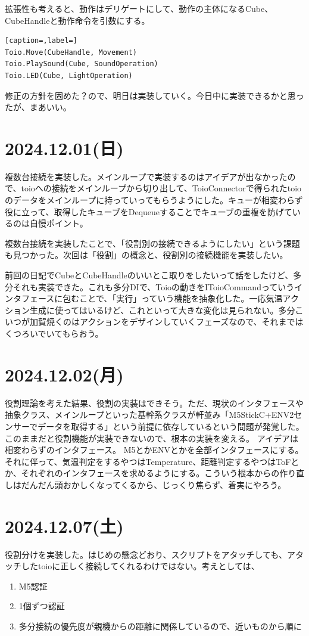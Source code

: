 \documentclass[fleqn,twocolumn]{mynote}
\begin{document}
  拡張性も考えると、動作はデリゲートにして、動作の主体になるCube、CubeHandleと動作命令を引数にする。

  \begin{lstlisting}[caption=,label=]
Toio.Move(CubeHandle, Movement)
Toio.PlaySound(Cube, SoundOperation)
Toio.LED(Cube, LightOperation)
  \end{lstlisting}

  修正の方針を固めた？ので、明日は実装していく。今日中に実装できるかと思ったが、まあいい。

  \section*{2024.12.01(日)}
  複数台接続を実装した。メインループで実装するのはアイデアが出なかったので、toioへの接続をメインループから切り出して、ToioConnectorで得られたtoioのデータをメインループに持っていってもらうようにした。キューが相変わらず役に立って、取得したキューブをDequeueすることでキューブの重複を防げているのは自慢ポイント。

  複数台接続を実装したことで、「役割別の接続できるようにしたい」という課題も見つかった。次回は「役割」の概念と、役割別の接続機能を実装したい。

  前回の日記でCubeとCubeHandleのいいとこ取りをしたいって話をしたけど、多分それも実装できた。これも多分DIで、Toioの動きをIToioCommandっていうインタフェースに包むことで、「実行」っていう機能を抽象化した。一応気温アクション生成に使ってはいるけど、これといって大きな変化は見られない。多分こいつが加賀焼くのはアクションをデザインしていくフェーズなので、それまではくつろいでいてもらおう。

  \section*{2024.12.02(月)}
  役割理論を考えた結果、役割の実装はできそう。ただ、現状のインタフェースや抽象クラス、メインループといった基幹系クラスが軒並み「M5StickC+ENV2センサーでデータを取得する」という前提に依存しているという問題が発覚した。このままだと役割機能が実装できないので、根本の実装を変える。
  アイデアは相変わらずのインタフェース。
  M5とかENVとかを全部インタフェースにする。それに伴って、気温判定をするやつはTemperature、距離判定するやつはToFとか、それぞれのインタフェースを求めるようにする。こういう根本からの作り直しはだんだん頭おかしくなってくるから、じっくり焦らず、着実にやろう。

  \section*{2024.12.07(土)}
  役割分けを実装した。はじめの懸念どおり、スクリプトをアタッチしても、アタッチしたtoioに正しく接続してくれるわけではない。考えとしては、
  \begin{enumerate}
    \item M5認証
    \item 1個ずつ認証
    \item 多分接続の優先度が親機からの距離に関係しているので、近いものから順に
  \end{enumerate}
\end{document}
